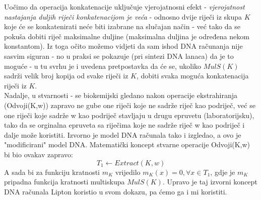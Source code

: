 \documentclass[12pt, a4paper]{book}
\begin{document}
\begin{spacing}{1.5}
\begin{nap}
Uočimo da operacija konkatenacije uključuje vjerojatnosni efekt - \textit{vjerojatnost nastajanja duljih riječi konkatenacijom je veća} - odnosno dvije riječi iz skupa $K$ koje će se konkatenirati neće biti izabrane na slučajan način - već tako da se pokuša dobiti riječ maksimalne duljine (maksimalna duljina je određena nekom konstantom). Iz toga očito možemo vidjeti da sam ishod DNA računanja nije sasvim siguran  - no u praksi se pokazuje (pri sintezi DNA lanaca) da je to moguće - u tu svrhu je i uvedena pretpostavka da će  se, ukoliko $MulS(K)$ sadrži velik broj kopija od svake riječi iz $K$, dobiti svaka moguća konkatenacija riječi iz $K$.\\
Nadalje, u stvarnosti - se biokemijski gledano nakon operacije ekstrahiranja (Odvoji(K,w)) zapravo ne gube one riječi koje ne sadrže riječ kao podriječ, već se one riječi koje sadrže w kao podriječ stavljaju u drugu epruvetu (laboratorijsku), tako da se orginalna epruveta sa riječima koje ne sadrže riječ w kao podriječ i dalje može koristiti. Izvorno je model DNA računala tako i izgledao, a ovo je "modificirani" model DNA. Matematički koncept stvarne operacije Odvoji(K,w) bi bio ovakav zapravo:
\[T_1 \leftarrow Extract(K,w)\]
A sada bi za funkciju kratnosti $m_K$ vrijedilo $m_K(x)=0, \forall	x \in T_1$, gdje je $m_K$ pripadna funkcija kratnosti multiskupa $MulS(K)$. Upravo je taj izvorni koncept DNA računala Lipton koristio u svom dokazu, pa ćemo ga i mi koristiti.  
\end{nap}

\end{spacing}
\end{document}
